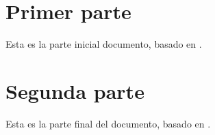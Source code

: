 \documentclass[a4paper,12pt]{article}
\begin{document}
	\section{Primer parte}
	\begin{refsection}
		Esta es la parte inicial documento, basado en \cite{guia1}.
	\end{refsection}
	
	\section{Segunda parte}
	\begin{refsection}
		Esta es la parte final del documento, basado en \cite{biber}.
	\end{refsection}
\printbibliography[section=1,title=Referencias de primer parte]
\printbibliography[section=2,title=Referencias de segunda parte]
\end{document}
